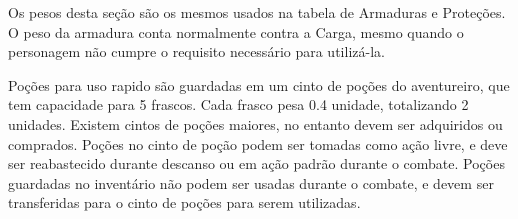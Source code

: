 Os pesos desta seção são os mesmos usados na tabela de Armaduras e Proteções. O peso da armadura conta normalmente contra a Carga, mesmo quando o personagem não cumpre o requisito necessário para utilizá-la.

Poções para uso rapido são guardadas em um cinto de poções do aventureiro, que tem capacidade para 5 frascos. Cada frasco pesa 0.4 unidade, totalizando 2 unidades. Existem cintos de poções maiores, no entanto devem ser adquiridos ou comprados.
Poções no cinto de poção podem ser tomadas como ação livre, e deve ser reabastecido durante descanso ou em ação padrão durante o combate. Poções guardadas no inventário não podem ser usadas durante o combate, e devem ser transferidas para o cinto de poções para serem utilizadas.
